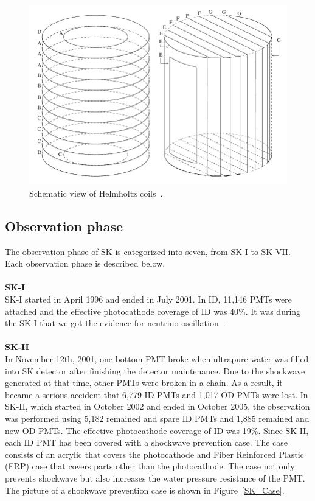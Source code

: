 \begin{figure}[H]
	\centering
	\includegraphics[width=12cm]{Figures/SK/Coil}
	\caption[Schematic view of Helmholtz coils]{
	Schematic view of Helmholtz coils~\cite{1998YamaguchiPhD}.
	}\label{SK_Coil}
\end{figure}





\subsection{Observation phase}\label{SK_Obs_pha}
\vs\hs
The observation phase of SK is categorized into seven, from SK-I to SK-VII.
Each observation phase is described below.\\
\\
\textbf{SK-I}\\
\hs
SK-I started in April 1996 and ended in July 2001.
In ID, 11,146 PMTs were attached and the effective photocathode coverage of ID was 40\%.
It was during the SK-I that we got the evidence for neutrino oscillation~\cite{1998Fukuda}.\\
\\
\textbf{SK-II}\\
\hs
In November 12th, 2001, one bottom PMT broke when ultrapure water was filled into SK detector after finishing the detector maintenance.
Due to the shockwave generated at that time, other PMTs were broken in a chain.
As a result, it became a serious accident that 6,779 ID PMTs and 1,017 OD PMTs were lost.
In SK-II, which started in October 2002 and ended in October 2005, the observation was performed using 5,182 remained and spare ID PMTs and 1,885 remained and new OD PMTs.
The effective photocathode coverage of ID was 19\%.
Since SK-II, each ID PMT has been covered with a shockwave prevention case.
The case consists of an acrylic that covers the photocathode and Fiber Reinforced Plastic (FRP) case that covers parts other than the photocathode.
The case not only prevents shockwave but also increases the water pressure resistance of the PMT.
The picture of a shockwave prevention case is shown in Figure~\ref{SK_Case}.\\

